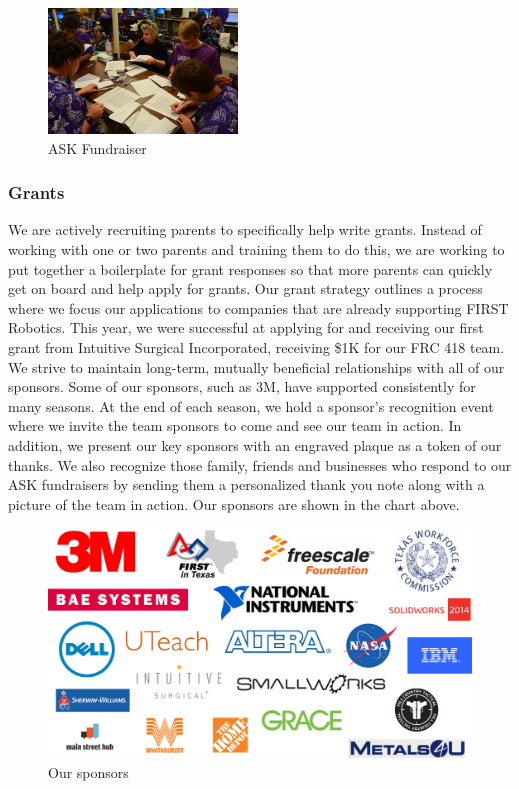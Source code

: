 \begin{figure}[H]
	\centering
	\includegraphics[height=0.3\linewidth]{ask}
	\caption[]{ASK Fundraiser}
	\label{fig:ask}
\end{figure}

\subsubsection{Grants}
We are actively recruiting parents to specifically help write grants.  Instead of working with one or two parents and training them to do this, we are working to put together a boilerplate for grant responses so that more parents can quickly get on board and help apply for grants.  Our grant strategy outlines a process where we focus our applications to companies that are already supporting FIRST Robotics.  This year, we were successful at applying for and receiving our first grant from Intuitive Surgical Incorporated, receiving \$1K for our FRC 418 team.\\

We strive to maintain long-term, mutually beneficial relationships with all of our sponsors. Some of our sponsors, such as 3M, have supported consistently for many seasons. At the end of each season, we hold a sponsor’s recognition event where we invite the team sponsors to come and see our team in action. In addition, we present our key sponsors with an engraved plaque as a token of our thanks. We also recognize those family, friends and businesses who respond to our ASK fundraisers by sending them a personalized thank you note along with a picture of the team in action.  
Our sponsors are shown in the chart above.

\begin{figure}[H]
	\centering
	\includegraphics[height=0.3\linewidth]{sponsors}
	\caption[]{Our sponsors}
	\label{fig:sponsors}
\end{figure}

